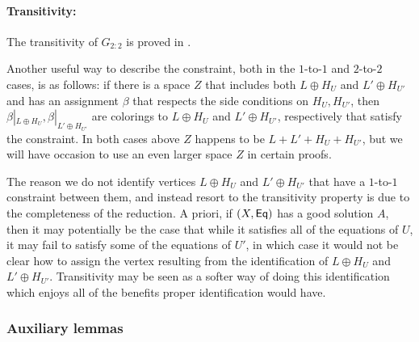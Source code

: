 \documentclass{toc}
\newcommand*\xor{\mathbin{\oplus}}
\begin{document}
\paragraph{Transitivity:} The transitivity of $G_{2:2}$ is proved in .

\begin{remark}\label{remark:useful_222}
Another useful way to describe the constraint, both in the $1$-to-$1$ and $2$-to-$2$
%
cases,  %
is as follows: if there is a space $Z$ that includes both
$L\xor H_U$ and $L' \xor H_{U'}$ and has an assignment $\beta$ that respects the side conditions on $H_{U}, H_{U'}$, then
$\beta|_{L\xor H_U}, \beta|_{L' \xor H_{U'}}$ are colorings to $L\xor H_U$ and  $L'\xor H_{U'}$, respectively that satisfy the constraint.  %
In both cases above $Z$ happens to be $L+ L' + H_U + H_{U'}$, but we will have occasion to use an even larger space $Z$ in certain proofs.
\end{remark}

\begin{remark}\label{remark:transitivity_why}
  The reason we do not identify vertices $L\oplus H_U$ and $L'\oplus H_{U'}$ that have a
  $1$-to-$1$ constraint between them, and instead resort to the transitivity property is due
  to the completeness of the reduction. A priori, if $(X,{\sf Eq})$ has a good solution $A$,
  then it may potentially be the case that while it satisfies all of the equations of $U$,
  it may fail to satisfy some of the equations of $U'$, in which case it would not be clear
  how to assign the vertex resulting from the identification of $L\oplus H_U$ and $L'\oplus H_{U'}$.
  Transitivity may be seen as a softer way of doing this identification which enjoys all of the benefits
  proper identification would have.
\end{remark}


%
\subsubsection{Auxiliary lemmas}
\end{document}
